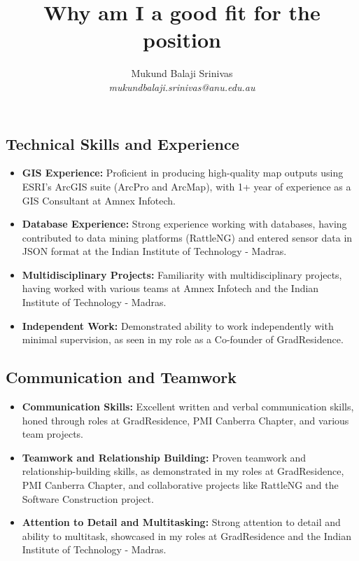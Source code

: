 \documentclass{article}
\title{Why am I a good fit for the position}
\author{Mukund Balaji Srinivas\\\textit{mukundbalaji.srinivas@anu.edu.au}}
\begin{document}
\maketitle

\sectionfont{\small}
\subsectionfont{\small}

\subsection*{Technical Skills and Experience}
\begin{itemize}
    \item \textbf{GIS Experience:} Proficient in producing high-quality map outputs using ESRI's ArcGIS suite (ArcPro and ArcMap), with 1+ year of experience as a GIS Consultant at Amnex Infotech.
    \item \textbf{Database Experience:} Strong experience working with databases, having contributed to data mining platforms (RattleNG) and entered sensor data in JSON format at the Indian Institute of Technology - Madras.
    \item \textbf{Multidisciplinary Projects:} Familiarity with multidisciplinary projects, having worked with various teams at Amnex Infotech and the Indian Institute of Technology - Madras.
    \item \textbf{Independent Work:} Demonstrated ability to work independently with minimal supervision, as seen in my role as a Co-founder of GradResidence.
\end{itemize}

\subsection*{Communication and Teamwork}
\begin{itemize}
    \item \textbf{Communication Skills:} Excellent written and verbal communication skills, honed through roles at GradResidence, PMI Canberra Chapter, and various team projects.
    \item \textbf{Teamwork and Relationship Building:} Proven teamwork and relationship-building skills, as demonstrated in my roles at GradResidence, PMI Canberra Chapter, and collaborative projects like RattleNG and the Software Construction project.
    \item \textbf{Attention to Detail and Multitasking:} Strong attention to detail and ability to multitask, showcased in my roles at GradResidence and the Indian Institute of Technology - Madras.
\end{itemize}
\end{document}

